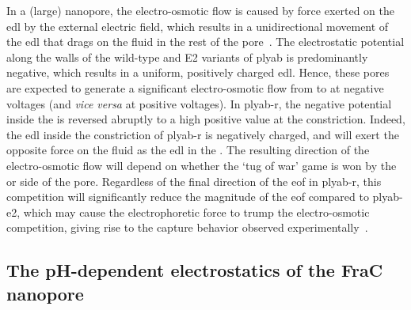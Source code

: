 In a (large) nanopore, the electro-osmotic flow is caused by force exerted on the \gls{edl} by the external
electric field, which results in a unidirectional movement of the \gls{edl} that drags on the fluid in the
rest of the pore~\cite{Qiao-Aluru-2003,Mao-2014,Tagliazucchi-2015,Bonome-2017}. The electrostatic potential
along the walls of the wild-type and E2 variants of \gls{plyab} is predominantly negative, which results in a
uniform, positively charged \gls{edl}. Hence, these pores are expected to generate a significant
electro-osmotic flow from \cisi{} to \transi{} at negative voltages (and \textit{vice versa} at positive
voltages). In \gls{plyab-r}, the negative potential inside the \transi{} \lumen{} is reversed abruptly to a
high positive value at the \cisi{} constriction. Indeed, the \gls{edl} inside the constriction of
\gls{plyab-r} is negatively charged, and will exert the opposite force on the fluid as the \gls{edl} in the
\transi{} \lumen{}. The resulting direction of the electro-osmotic flow will depend on whether the `tug of
war' game is won by the \cisi{} or \transi{} side of the pore. Regardless of the final direction of the
\gls{eof} in \gls{plyab-r}, this competition will significantly reduce the magnitude of the \gls{eof} compared
to \gls{plyab-e2}, which may cause the electrophoretic force to trump the electro-osmotic competition, giving
rise to the capture behavior observed experimentally~\cite{Huang-2020}.





\subsection{The {pH}-dependent electrostatics of the FraC nanopore}
%
\label{sec:elec:frac}
%

